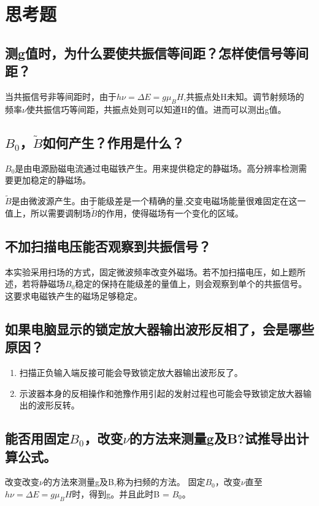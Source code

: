 \documentclass[a4paper]{article}
\begin{document}
\section{思考题}
\subsection{测g值时，为什么要使共振信等间距？怎样使信号等间距？}
当共振信号非等间距时，由于$h\nu = \Delta E = g\mu_B H$,共振点处H未知。调节射频场的 频率$\nu$使共振信巧等间距，共振点处则可以知道H的值。进而可以测出g值。
\subsection{$B_0$，$\tilde{B}$如何产生？作用是什么？}
$B_0$是由电源励磁电流通过电磁铁产生。用来提供稳定的静磁场。高分辨率检测需要更加稳定的静磁场。

$\tilde{B}$是由微波源产生。由于能级差是一个精确的量,交变电磁场能量很难固定在这一值上，所以需要调制场$\tilde{B}$的作用，使得磁场有一个变化的区域。
\subsection{不加扫描电压能否观察到共振信号？}
本实验采用扫场的方式，固定微波频率改变外磁场。若不加扫描电压，如上题所述，若将静磁场$B_0$稳定的保持在能级差的量值上，则会观察到单个的共振信号。这要求电磁铁产生的磁场足够稳定。
\subsection{如果电脑显示的锁定放大器输出波形反相了，会是哪些原因？}
\begin{enumerate}
\item 扫描正负输入端反接可能会导致锁定放大器输出波形反了。
\item 示波器本身的反相操作和弛豫作用引起的发射过程也可能会导致锁定放大器输出的波形反转。
\end{enumerate}
\subsection{能否用固定$B_0$，改变$\nu$的方法来测量g及B?试推导出计算公式。}
改变改变$\nu$的方法來测量g及B,称为扫频的方法。
固定$B_0$，改变$\nu$直至$h\nu = \Delta E = g\mu_B H$时，得到g。并且此时B = $B_0$。

\nocite{jiaocai}

\end{document}
